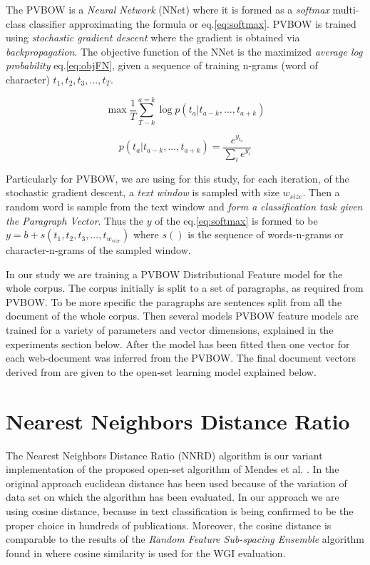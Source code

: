 \documentclass[runningheads]{llncs}
\begin{document}
The PVBOW is a \textit{Neural Network} (NNet) where it is formed as a \textit{softmax} multi-class classifier approximating the formula or eq.\ref{eq:softmax}. PVBOW is trained using \textit{stochastic gradient descent} where the gradient is obtained via \textit{backpropagation}. The objective function of the NNet is the maximized \textit{average log probability} eq.\ref{eq:objFN}, given a sequence of training n-grams (word of character) $t_{1}, t_{2}, t_{3}, ..., t_{T}$.

\begin{equation} \label{eq:objFN}
    \max{\frac{1}{T} \sum^{a=k}_{T-k}{\log{p(t_{a}|t_{a-k},...,t_{a+k})}}}
\end{equation}

\begin{equation} \label{eq:softmax}
    p(t_{a}|t_{a-k},...,t_{a+k}) = \frac{e^{y_{t_{a}}}}{\sum_{i}{e^{y_i}}}
\end{equation}

Particularly for PVBOW, we are using for this study, for each iteration, of the stochastic gradient descent, a \textit{text window} is sampled with size $w_{size}$. Then a random word is sample from the text window and \textit{form a classification task given the Paragraph Vector}. Thus the $y$ of the eq.\ref{eq:softmax} is formed to be $y = b + s(t_{1},t_{2},t_{3},...,t_{w_{size}})$ where $s()$ is the sequence of words-n-grams or character-n-grams of the sampled window.

In our study we are training a PVBOW Distributional Feature model for the whole corpus. The corpus initially is split to a set of paragraphs, as required from PVBOW. To be more specific the paragraphs are sentences split from all the document of the whole corpus. Then several models PVBOW feature models are trained for a variety of parameters and vector dimensions, explained in the experiments section below. After the model has been fitted then one vector for each web-document was inferred from the PVBOW. The final document vectors derived from  are given to the open-set learning model explained below.

\section{Nearest Neighbors Distance Ratio}\label{sec:NNRD_Description}

The Nearest Neighbors Distance Ratio (NNRD) algorithm is our variant implementation of the proposed open-set algorithm of Mendes et al. \cite{mendesjunior2016}. In the original approach euclidean distance has been used because of the variation of data set on which the algorithm has been evaluated. In our approach we are using cosine distance, because in text classification is being confirmed to be the proper choice in hundreds of publications. Moreover, the cosine distance is comparable to the results of the \textit{Random Feature Sub-spacing Ensemble} algorithm found in \cite{pritsos2018open} where cosine similarity is used for the WGI evaluation.
\end{document}
